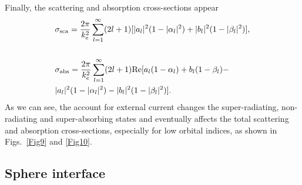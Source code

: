 \documentclass[aps,prb,reprint]{revtex4-2}
\begin{document}
Finally, the scattering and absorption cross-sections appear 
\begin{eqnarray}
	&\displaystyle 
	\sigma_{\rm sca}=
	\frac{2\pi}{k_e^2}\sum\limits_{l=1}^\infty 
	(2l+1)[|a_l|^2(1-|\alpha_l|^2)+|b_l|^2(1-|\beta_l|^2)],\nonumber
\\&\label{S_sca_source}\\
	&\displaystyle 
	\sigma_{\rm abs}=
	\frac{2\pi}{k_e^2}\sum\limits_{l=1}^\infty 
	(2l+1){\rm Re}[a_l(1-\alpha_l)+b_l(1-\beta_l)-\nonumber\\
	&\displaystyle 
	|a_l|^2(1-|\alpha_l|^2)-|b_l|^2(1-|\beta_l|^2)].\label{S_abs_source}
\end{eqnarray} 
As we can see, the account for external current changes the super-radiating, non-radiating and super-absorbing states and eventually affects the total scattering and absorption cross-sections, especially for low orbital indices, as shown in Figs.~\ref{Fig9} and \ref{Fig10}. 
 
\subsection{Sphere interface}
\end{document}
